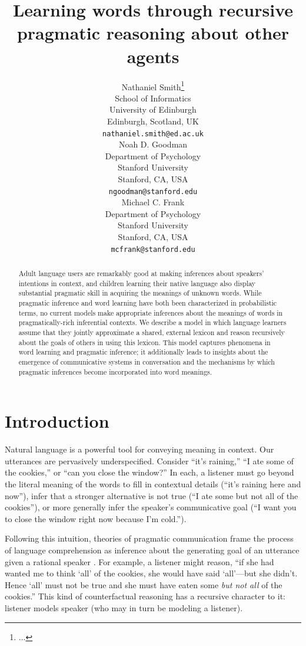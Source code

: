 \documentclass{article} %
\title{Learning words through recursive pragmatic reasoning about other agents}
\author{
Nathaniel Smith\thanks{...} \\
School of Informatics\\
University of Edinburgh\\
Edinburgh, Scotland, UK\\
\texttt{nathaniel.smith@ed.ac.uk} \\
\AND
Noah D. Goodman \\
Department of Psychology\\
Stanford University \\
Stanford, CA, USA \\
\texttt{ngoodman@stanford.edu} \\
\And
Michael C. Frank \\
Department of Psychology \\
Stanford University \\
Stanford, CA, USA \\
\texttt{mcfrank@stanford.edu}}
\begin{document}
\maketitle

\begin{abstract}
Adult language users are remarkably good at making inferences about speakers' intentions in context, and children learning their native language also display substantial pragmatic skill in acquiring the meanings of unknown words. While pragmatic inference and word learning have both been characterized in probabilistic terms, no current models make appropriate inferences about the meanings of words in pragmatically-rich inferential contexts. We describe a model in which language learners assume that they jointly approximate a shared, external lexicon and reason recursively about the goals of others in using this lexicon. This model captures phenomena in word learning and pragmatic inference; it additionally leads to insights about the emergence of communicative systems in conversation and the mechanisms by which pragmatic inferences become incorporated into word meanings.
\end{abstract}

\section{Introduction}

Natural language is a powerful tool for conveying meaning in context. Our utterances are pervasively underspecified. Consider ``it's raining,'' ``I ate some of the cookies,'' or ``can you close the window?'' In each, a listener must go beyond the literal meaning of the words to fill in contextual details (``it's raining here and now''), infer that a stronger alternative is not true (``I ate some but not all of the cookies''), or more generally infer the speaker's communicative goal (``I want you to close the window right now because I'm cold.'').

Following this intuition, theories of pragmatic communication frame the process of language comprehension as inference about the generating goal of an utterance given a rational speaker \cite{grice1975,dale1995,frank2012}. For example, a listener might reason, ``if she had wanted me to think `all' of the cookies, she would have said `all'---but she didn't. Hence `all' must not be true and she must have eaten some {\it but not all} of the cookies.'' This kind of counterfactual reasoning has a recursive character to it: listener models speaker (who may in turn be modeling a listener).
\end{document}
